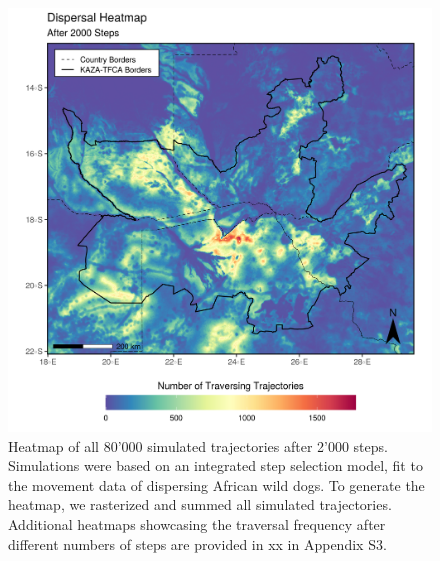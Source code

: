 \documentclass[abstract=on,10pt,a4paper,bibliography=totocnumbered]{article}
\begin{document}
\begin{figure}
  \includegraphics[width=\textwidth]{99_Heatmap.png}
  \caption{Heatmap of all 80'000 simulated trajectories after 2'000 steps.
  Simulations were based on an integrated step selection model, fit to the
  movement data of dispersing African wild dogs. To generate the heatmap, we
  rasterized and summed all simulated trajectories. Additional heatmaps
  showcasing the traversal frequency after different numbers of steps are
  provided in xx in Appendix S3.}
  \label{Heatmap}
\end{figure}
\end{document}
